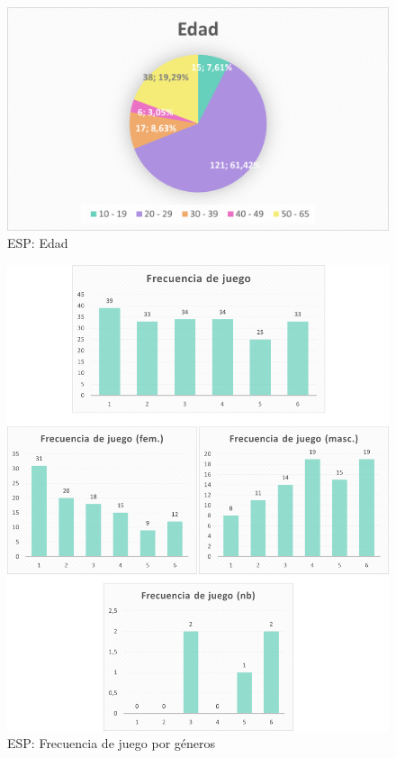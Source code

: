 \documentclass[12pt, a4paper,twoside,titlepage]{book}
\begin{document}
\begin{figure}
    \centering
    \includegraphics[width=.8\linewidth]{ANEXO ESP/2AnexESP}
    \caption{ESP: Edad}
    \label{fig:ESPEdad}
\end{figure}


\begin{figure}
    \centering
    \includegraphics[width=1\linewidth]{ANEXO ESP/3AnexGENFrecALL}
    \caption{ESP: Frecuencia de juego por géneros}
    \label{fig:ESPFrec}
\end{figure}
\end{document}
